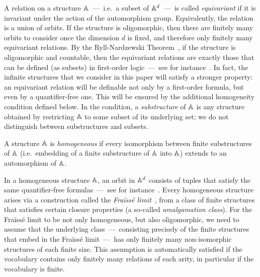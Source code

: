 A relation on a structure $\mathbb{A}$~---~i.e.~a subset of $\mathbb{A}^d$~---~is called \emph{equivariant} if it is invariant under the action of the automorphism group. 
Equivalently, the relation is a union of orbits. 
If the structure is oligomorphic, then there are finitely many orbits to consider once the dimension $d$ is fixed, 
and therefore only finitely many equivariant relations. 
By the Ryll-Nardzewski Theorem~\cite[Thm.~7.3.1]{hodges1993model}, if the structure is oligomorphic and countable, 
then the equivariant relations are exactly those that can be defined (as subsets) in first-order logic~---~see for instance~\cite[Cl.~5.9]{bojanczyk_slightly}. 
In fact, the infinite structures that we consider in this paper will satisfy a stronger property: 
an equivariant relation will be definable not only by a first-order formula, but even by a quantifier-free one. 
This will be ensured by the additional homogeneity condition defined below. 
In the condition, a \emph{substructure} of $\mathbb{A}$ is any structure obtained by restricting $\mathbb{A}$ to some subset  of its underlying set; 
we do not distinguish between substructures and subsets.

\begin{definition} 
    A structure $\mathbb{A}$ is \emph{homogeneous} if every isomorphism between finite substructures of $\mathbb{A}$ 
    (i.e.~embedding of a finite substructure of $\mathbb{A}$ into $\mathbb{A}$) 
    extends to an automorphism of $\mathbb{A}$.
\end{definition}

In a homogeneous structure $\mathbb{A}$, an orbit in $\mathbb{A}^d$ consists of tuples that satisfy the same quantifier-free formulas~---~see for instance~\cite[Thm.~6.3]{bojanczyk_slightly}. 
Every homogeneous structure arises via a construction called the \emph{Fraïssé limit}~\cite[Sec.~7.4]{hodges1993model}, from a class of finite structures that satisfies certain closure properties (a so-called \emph{amalgamation class}). 
For the Fraïssé limit to be not only homogeneous, but also oligomorphic, we need to assume that the underlying class~---~consisting precisely of the finite structures that embed in the Fraïssé limit~---~has only finitely many non-isomorphic structures of each finite size. 
This assumption is automatically satisfied if the vocabulary contains only finitely many relations of each arity,
in particular if the vocabulary is finite.

